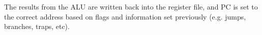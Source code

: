 \documentclass{article}
\begin{document}
The results from the ALU are written back into the register file, and PC is set to the correct address based
on flags and information set previously (e.g. jumps, branches, traps, etc).


\end{document}
